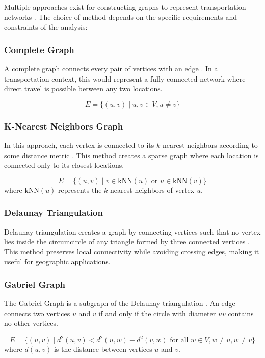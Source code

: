 Multiple approaches exist for constructing graphs to represent transportation networks . The choice of method depends on the specific requirements and constraints of the analysis:

\subsubsection{Complete Graph}
A complete graph connects every pair of vertices with an edge . In a transportation context, this would represent a fully connected network where direct travel is possible between any two locations.

\begin{equation}
    E = \{(u, v) \mid u, v \in V, u \neq v\}
\end{equation}

\subsubsection{K-Nearest Neighbors Graph}
In this approach, each vertex is connected to its $k$ nearest neighbors according to some distance metric . This method creates a sparse graph where each location is connected only to its closest locations.

\begin{equation}
    E = \{(u, v) \mid v \in \text{kNN}(u) \text{ or } u \in \text{kNN}(v)\}
\end{equation}
where $\text{kNN}(u)$ represents the $k$ nearest neighbors of vertex $u$.

\subsubsection{Delaunay Triangulation}
Delaunay triangulation creates a graph by connecting vertices such that no vertex lies inside the circumcircle of any triangle formed by three connected vertices . This method preserves local connectivity while avoiding crossing edges, making it useful for geographic applications.

\subsubsection{Gabriel Graph}
The Gabriel Graph is a subgraph of the Delaunay triangulation . An edge connects two vertices $u$ and $v$ if and only if the circle with diameter $uv$ contains no other vertices.

\begin{equation}
    E = \{(u, v) \mid d^2(u, v) < d^2(u, w) + d^2(v, w) \text{ for all } w \in V, w \neq u, w \neq v\}
\end{equation}
where $d(u, v)$ is the distance between vertices $u$ and $v$.

